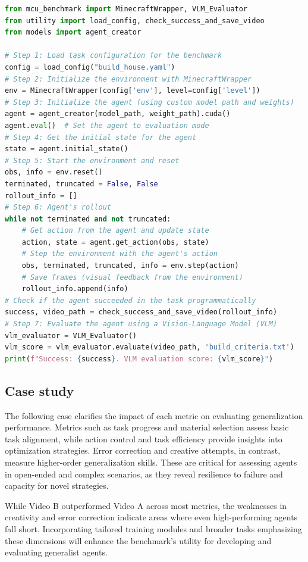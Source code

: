 \begin{lstlisting}[language=Python, caption=MCU Evaluation Process Pseudo-Code]
from mcu_benchmark import MinecraftWrapper, VLM_Evaluator
from utility import load_config, check_success_and_save_video
from models import agent_creator

# Step 1: Load task configuration for the benchmark
config = load_config("build_house.yaml")  
# Step 2: Initialize the environment with MinecraftWrapper
env = MinecraftWrapper(config['env'], level=config['level'])
# Step 3: Initialize the agent (using custom model path and weights)
agent = agent_creator(model_path, weight_path).cuda()
agent.eval()  # Set the agent to evaluation mode
# Step 4: Get the initial state for the agent
state = agent.initial_state()
# Step 5: Start the environment and reset
obs, info = env.reset()
terminated, truncated = False, False
rollout_info = []
# Step 6: Agent's rollout
while not terminated and not truncated:
    # Get action from the agent and update state
    action, state = agent.get_action(obs, state)
    # Step the environment with the agent's action
    obs, terminated, truncated, info = env.step(action)
    # Save frames (visual feedback from the environment)
    rollout_info.append(info)
# Check if the agent succeeded in the task programmatically
success, video_path = check_success_and_save_video(rollout_info)
# Step 7: Evaluate the agent using a Vision-Language Model (VLM)
vlm_evaluator = VLM_Evaluator()
vlm_score = vlm_evaluator.evaluate(video_path, 'build_criteria.txt')
print(f"Success: {success}. VLM evaluation score: {vlm_score}")
\end{lstlisting}

\newpage

\subsection{Case study}

The following case clarifies the impact of each metric on evaluating generalization performance. Metrics such as task progress and material selection assess basic task alignment, while action control and task efficiency provide insights into optimization strategies.
Error correction and creative attempts, in contrast, measure higher-order generalization skills. These are critical for assessing agents in open-ended and complex scenarios, as they reveal resilience to failure and capacity for novel strategies.

While Video B outperformed Video A across most metrics, the weaknesses in creativity and error correction indicate areas where even high-performing agents fall short. Incorporating tailored training modules and broader tasks emphasizing these dimensions will enhance the benchmark’s utility for developing and evaluating generalist agents.

